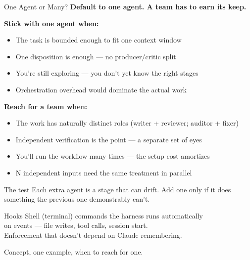 \documentclass[aspectratio=169, 11pt]{beamer}
\begin{document}
\begin{frame}{One Agent or Many?}
  \textbf{Default to one agent. A team has to earn its keep.}

  \vspace{0.5em}
  \textbf{Stick with one agent when:}
  \begin{itemize}\small
    \item The task is bounded enough to fit one context window
    \item One disposition is enough --- no producer/critic split
    \item You're still exploring --- you don't yet know the right stages
    \item Orchestration overhead would dominate the actual work
  \end{itemize}

  \vspace{0.5em}
  \textbf{Reach for a team when:}
  \begin{itemize}\small
    \item The work has naturally distinct roles (writer + reviewer; auditor + fixer)
    \item Independent verification is the point --- a separate set of eyes
    \item You'll run the workflow many times --- the setup cost amortizes
    \item N independent inputs need the same treatment in parallel
  \end{itemize}

  \vspace{0.4em}
  \begin{block}{The test}
    Each extra agent is a stage that can drift. Add one only if it does something the previous one demonstrably can't.
  \end{block}
\end{frame}


\begin{frame}{Hooks}
  \centering
  \vspace{2em}
  {\Large Shell (terminal) commands the harness runs automatically\\[0.3em]
  on events --- file writes, tool calls, session start.\\[0.3em]
  Enforcement that doesn't depend on Claude remembering.}

  \vspace{2em}
  Concept, one example, when to reach for one.
\end{frame}
\end{document}
